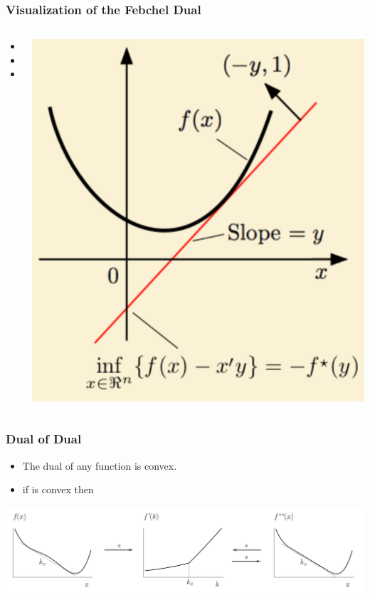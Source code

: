 \documentclass[handout]{beamer}
\begin{document}
\begin{small}
\begin{frame}
  \frametitle{Visualization of the Febchel Dual}
  \begin{columns}
    \begin{column}{0.55\textwidth}
        \begin{itemize}
            \item {}
            \item {}
            \item {}
        \end{itemize}
    \end{column}
    \begin{column}{0.43\textwidth}
          \includegraphics[width=\textwidth]{figures/Legendre-Duality.png}
    \end{column}
\end{columns}
\end{frame}

\begin{frame}
  \frametitle{Dual of Dual}
  \begin{itemize}
  \item The dual of any function is convex.
  \item if  is convex then 
  \end{itemize}
  \includegraphics[width=\textwidth]{figures/FromNonConvexToConvex.png}  
\end{frame}


\end{small}
\end{document}
